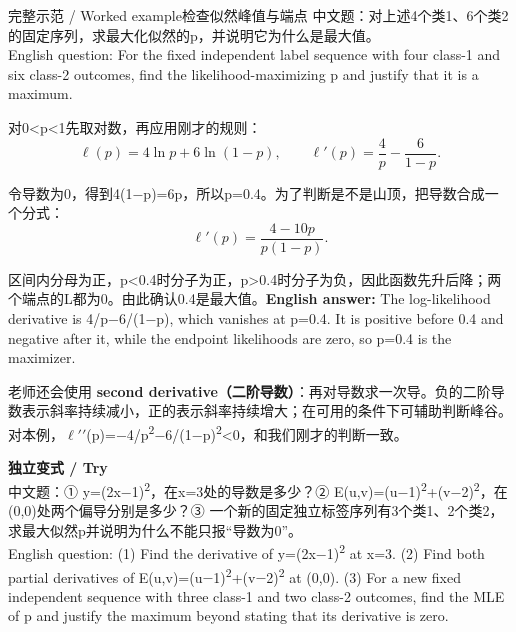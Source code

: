 \begin{StudyBlock}{完整示范 / Worked example}{检查似然峰值与端点}
中文题：对上述4个类1、6个类2的固定序列，求最大化似然的p，并说明它为什么是最大值。\\

English question: For the fixed independent label sequence with four class-1 and six class-2 outcomes, find the likelihood-maximizing p and justify that it is a maximum.


对0<p<1先取对数，再应用刚才的规则：
\[
\ell(p)=4\ln p+6\ln(1-p),\qquad
\ell'(p)=\frac4p-\frac6{1-p}.\tag{M.21}
\]


令导数为0，得到4(1\ensuremath{-}p)=6p，所以p=0.4。为了判断是不是山顶，把导数合成一个分式：
\[
\ell'(p)=\frac{4-10p}{p(1-p)}.\tag{M.22}
\]


区间内分母为正，p<0.4时分子为正，p>0.4时分子为负，因此函数先升后降；两个端点的L都为0。由此确认0.4是最大值。\textbf{English answer:} The log-likelihood derivative is 4/p\ensuremath{-}6/(1\ensuremath{-}p), which vanishes at p=0.4. It is positive before 0.4 and negative after it, while the endpoint likelihoods are zero, so p=0.4 is the maximizer.
\end{StudyBlock}


老师还会使用 \textbf{second derivative（二阶导数）}：再对导数求一次导。负的二阶导数表示斜率持续减小，正的表示斜率持续增大；在可用的条件下可辅助判断峰谷。对本例，\ensuremath{\ell}\ensuremath{\prime\prime}(p)=\ensuremath{-}4/p\textsuperscript{2}\ensuremath{-}6/(1\ensuremath{-}p)\textsuperscript{2}<0，和我们刚才的判断一致。


\textbf{独立变式 / Try}\\

中文题：① y=(2x\ensuremath{-}1)\textsuperscript{2}，在x=3处的导数是多少？② E(u,v)=(u\ensuremath{-}1)\textsuperscript{2}+(v\ensuremath{-}2)\textsuperscript{2}，在(0,0)处两个偏导分别是多少？③ 一个新的固定独立标签序列有3个类1、2个类2，求最大似然p并说明为什么不能只报“导数为0”。\\

English question: (1) Find the derivative of y=(2x\ensuremath{-}1)\textsuperscript{2} at x=3. (2) Find both partial derivatives of E(u,v)=(u\ensuremath{-}1)\textsuperscript{2}+(v\ensuremath{-}2)\textsuperscript{2} at (0,0). (3) For a new fixed independent sequence with three class-1 and two class-2 outcomes, find the MLE of p and justify the maximum beyond stating that its derivative is zero.



